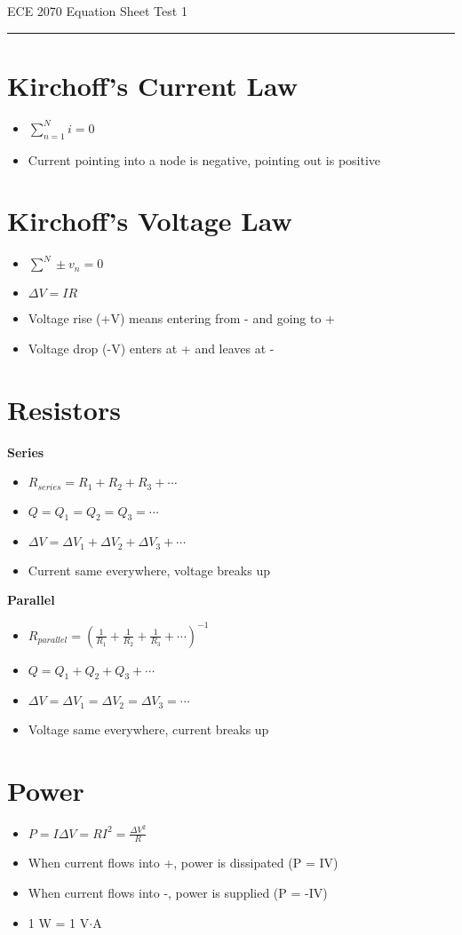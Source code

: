 \documentclass [12pt] {article}
\begin{document}
ECE 2070 Equation Sheet \hfill Test 1 \\
\rule{7.6in}{0.4pt}
\begin{multicols*}{2}
\section{Kirchoff's Current Law} 
	\begin{itemize}
		\item $\sum\limits_{n=1}^N i = 0$ 
		\item Current pointing into a node is negative, pointing out is positive
	\end{itemize}
\section{Kirchoff's Voltage Law}
	\begin{itemize}
		\item $\sum\limits^N \pm v_n = 0$
		\item $\Delta V = IR$
		\item Voltage rise (+V) means entering from - and going to +
		\item Voltage drop (-V) enters at + and leaves at -
	\end{itemize}
\section{Resistors}
\textbf{Series}
	\begin{itemize}
		\item $R_{series} = R_1 + R_2 + R_3 + \cdots$
		\item $Q = Q_1 = Q_2 = Q_3 = \cdots $
		\item $\Delta V = \Delta V_1 + \Delta V_2 + \Delta V_3 + \cdots$
		\item Current same everywhere, voltage breaks up
	\end{itemize}
\textbf{Parallel} 
	\begin{itemize}
		\item $R_{parallel} = \left(\frac{1}{R_1} + \frac{1}{R_2} + \frac{1}{R_3} + \cdots\right)^{-1} $
		\item $Q = Q_1 + Q_2 + Q_3 + \cdots $
		\item $\Delta V = \Delta V_1 = \Delta V_2 = \Delta V_3 = \cdots $
		\item Voltage same everywhere, current breaks up 
	\end{itemize}
\section{Power}
	\begin{itemize}
		\item $P = I\Delta V = RI^2 = \frac{\Delta V^2}{R}$ 
		\item When current flows into +, power is dissipated (P = IV) 
		\item When current flows into -, power is supplied (P = -IV) 
		\item 1 W = 1 V$\cdot$A 
	\end{itemize}

\end{multicols*}
\end{document}
